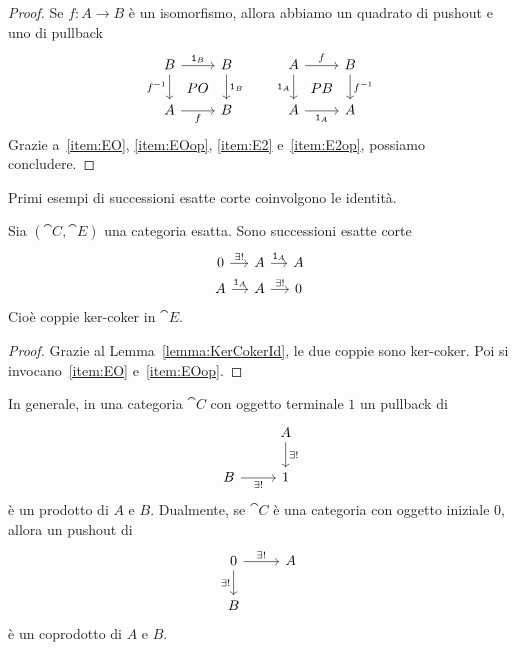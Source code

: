 \begin{proof}
  Se \(f : A \to B\) è un isomorfismo, allora abbiamo un quadrato di
  pushout e uno di pullback
  \[
    \begin{tikzcd}
      B \ar["{f^{-1}}", d, swap] \ar["{PO}" description, dr, phantom] \ar["{\id_B}", r] & B \ar["{\id_B}", d] \\
      A \ar["{f}", r, swap] & B
    \end{tikzcd}
    \qquad
    \begin{tikzcd}
      A \ar["{\id_A}", d, swap] \ar["{PB}" description, dr, phantom] \ar["{f}", r] & B \ar["{f^{-1}}", d] \\
      A \ar["{\id_A}", r, swap] & A
    \end{tikzcd}
  \]
  Grazie a~\ref{item:EO}, \ref{item:EOop}, \ref{item:E2}
  e~\ref{item:E2op}, possiamo concludere.
\end{proof}

Primi esempi di successioni esatte corte coinvolgono le identità.

\begin{proposition}\label{proposition:ExactId}
  Sia \((\cat C,\cat E)\) una categoria esatta. Sono successioni esatte
  corte
  \[
    \begin{tikzcd}[row sep=tiny, column sep=small]
      0 \ar["{\exists!}", r] & A \ar["{\id_A}", r] & A \\
      A \ar["{\id_A}", r] & A \ar["{\exists!}", r] & 0
    \end{tikzcd}
  \]
  Cioè coppie ker-coker in \(\cat E\).
\end{proposition}

\begin{proof}
  Grazie al Lemma~\ref{lemma:KerCokerId}, le due coppie sono
  ker-coker. Poi si invocano~\ref{item:EO} e~\ref{item:EOop}.
\end{proof}

\begin{recall}
  In generale, in una categoria \(\cat C\) con oggetto terminale \(1\)
  un pullback di
  \[
    \begin{tikzcd}
      & A \ar["{\exists!}",d] \\
      B \ar["{\exists!}", r, swap] & 1
    \end{tikzcd}
  \]
  è un prodotto di \(A\) e \(B\). Dualmente, se \(\cat C\) è una
  categoria con oggetto iniziale \(0\), allora un pushout di
  \[
    \begin{tikzcd}
      0 \ar["{\exists!}",r] \ar["{\exists!}", d, swap]  & A \\
      B
    \end{tikzcd}
  \]
  è un coprodotto di \(A\) e \(B\).
\end{recall}

